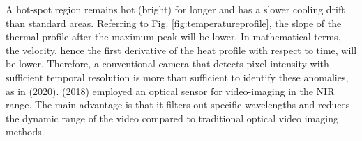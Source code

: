 A hot-spot region remains hot (bright) for longer and has a slower cooling drift than standard areas. Referring to Fig. \ref{fig:temperatureprofile}, the slope of the thermal profile after the maximum peak will be lower. In mathematical terms, the velocity, hence the first derivative of the heat profile with respect to time, will be lower. Therefore, a conventional camera that detects pixel intensity with sufficient temporal resolution is more than sufficient to identify these anomalies, as in \citeauthor{grasso_-situ_2021} (2020). \citeauthor{boone_thermal_2018} (2018) employed an optical sensor for video-imaging in the NIR range. The main advantage is that it filters out specific wavelengths and reduces the dynamic range of the video compared to traditional optical video imaging methods.
